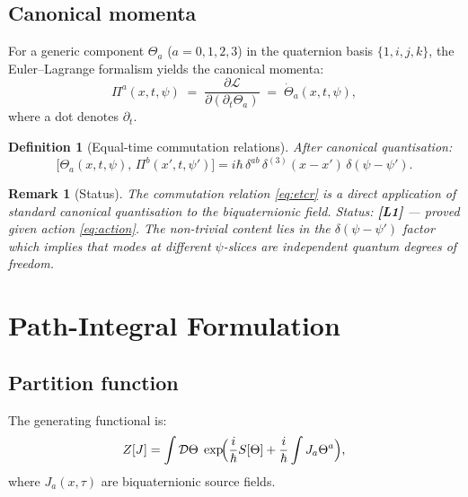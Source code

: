 \documentclass[11pt,a4paper]{article}
\newtheorem{definition}{Definition}
\newtheorem{remark}{Remark}
\begin{document}
\subsection{Canonical momenta}

For a generic component $\Theta_a$ ($a = 0,1,2,3$) in the quaternion basis
$\{1, i, j, k\}$, the Euler--Lagrange formalism yields the canonical momenta:
\begin{equation}
\label{eq:pi}
  \Pi^a(x, t, \psi) \;=\; \frac{\partial \mathcal{L}}{\partial(\partial_t \Theta_a)}
  \;=\; \dot{\Theta}_a(x, t, \psi),
\end{equation}
where a dot denotes $\partial_t$.

\begin{definition}[Equal-time commutation relations]\label{def:etcr}
After canonical quantisation:
\begin{equation}
\label{eq:etcr}
  \bigl[\Theta_a(x, t, \psi),\, \Pi^b(x', t, \psi')\bigr]
  = i\hbar\, \delta^{ab}\, \delta^{(3)}(x - x')\, \delta(\psi - \psi').
\end{equation}
\end{definition}

\begin{remark}[Status]
  The commutation relation \eqref{eq:etcr} is a direct application of
  standard canonical quantisation to the biquaternionic field.
  Status: \textbf{[L1]} — proved given action \eqref{eq:action}.
  The non-trivial content lies in the $\delta(\psi-\psi')$ factor which
  implies that modes at different $\psi$-slices are independent quantum
  degrees of freedom.
\end{remark}

\section{Path-Integral Formulation}
\label{sec:path_integral}

\subsection{Partition function}

The generating functional is:
\begin{equation}
\label{eq:Z}
  Z[J]
  = \int \mathcal{D}\Theta\; \exp\!\Bigl(
      \frac{i}{\hbar} S[\Theta]
      + \frac{i}{\hbar}\int J_a \Theta^a
    \Bigr),
\end{equation}
where $J_a(x,\tau)$ are biquaternionic source fields.
\end{document}
